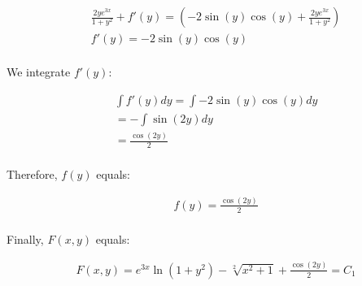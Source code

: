 \documentclass{article}
\begin{document}
\begin{singlespace}
\begin{align*}
            &\frac{2ye^{3x}}{1+y^{2}} + f'(y) = \left( -2\sin(y)\cos(y) + \frac{2ye^{3x}}{1+y^{2}}\right) \\
            &f'(y) = -2\sin(y)\cos(y) \\
        \end{align*}
        \begin{flushleft}
            We integrate $f'(y)$:
        \end{flushleft}
        \begin{align*}
            &\int f'(y)dy = \int -2\sin(y)\cos(y)dy \\
            &= -\int \sin(2y)dy \\
            &= \frac{\cos(2y)}{2} \\ 
        \end{align*}
        \begin{flushleft}
            Therefore, $f(y)$ equals:
        \end{flushleft}
        \begin{align*}
            &f(y) = \frac{\cos(2y)}{2} \\
        \end{align*}
        \begin{flushleft}
            Finally, $F(x, y)$ equals:
        \end{flushleft}
        \begin{align*}
            &F(x, y) = e^{3x}\ln(1+y^{2}) - \sqrt[2]{x^{2}+1} + \frac{\cos(2y)}{2} = C_1 \\
        \end{align*}
    \end{singlespace}
\end{document}
